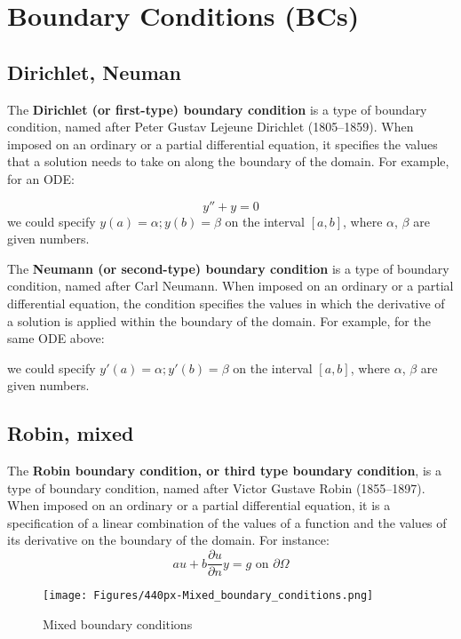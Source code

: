 \newpage

\section{Boundary Conditions (BCs)}

\subsection{Dirichlet, Neuman}
The \textbf{Dirichlet (or first-type) boundary condition }is a type of boundary condition, named after Peter Gustav Lejeune Dirichlet (1805–1859). When imposed on an ordinary or a partial differential equation, it specifies the values that a solution needs to take on along the boundary of the domain. For example, for an ODE:

\begin{equation}
	y''+y=0
\end{equation}
we could specify $y(a)=\alpha; y(b)=\beta$ on the interval $[a,b]$, where $\alpha$, $\beta$ are given numbers.

The \textbf{Neumann (or second-type) boundary condition} is a type of boundary condition, named after Carl Neumann. When imposed on an ordinary or a partial differential equation, the condition specifies the values in which the derivative of a solution is applied within the boundary of the domain. For example, for the same ODE above:

we could specify $y'(a)=\alpha; y'(b)=\beta$ on the interval $[a,b]$, where $\alpha$, $\beta$ are given numbers.

\subsection{Robin, mixed}
The \textbf{Robin boundary condition, or third type boundary condition}, is a type of boundary condition, named after Victor Gustave Robin (1855–1897). When imposed on an ordinary or a partial differential equation, it is a specification of a linear combination of the values of a function and the values of its derivative on the boundary of the domain. For instance:\\

\begin{equation}
	au+b\frac{\partial u}{\partial n}y=g \textrm{ on } \partial \Omega
\end{equation}


\begin{figure}[h!]
	\begin{center}
		\texttt{[image: Figures/440px-Mixed\_boundary\_conditions.png]}
	\end{center}
	\caption{Mixed boundary conditions}
\end{figure}


